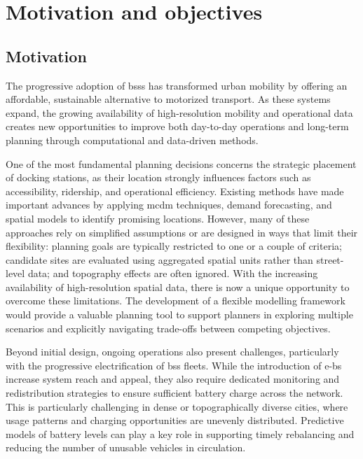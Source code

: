 \section{Motivation and objectives}
\label{sec:motivation_and_objectives}

\subsection{Motivation}

The progressive adoption of \acp{bss} has transformed urban mobility by offering an affordable, sustainable alternative to motorized transport. As these systems expand, the growing availability of high-resolution mobility and operational data creates new opportunities to improve both day-to-day operations and long-term planning through computational and data-driven methods.

One of the most fundamental planning decisions concerns the strategic placement of docking stations, as their location strongly influences factors such as accessibility, ridership, and operational efficiency. Existing methods have made important advances by applying \ac{mcdm} techniques, demand forecasting, and spatial models to identify promising locations. However, many of these approaches rely on simplified assumptions or are designed in ways that limit their flexibility: planning goals are typically restricted to one or a couple of criteria; candidate sites are evaluated using aggregated spatial units rather than street-level data; and topography effects are often ignored. With the increasing availability of high-resolution spatial data, there is now a unique opportunity to overcome these limitations. The development of a flexible modelling framework would provide a valuable planning tool to support planners in exploring multiple scenarios and explicitly navigating trade-offs between competing objectives.

Beyond initial design, ongoing operations also present challenges, particularly with the progressive electrification of \ac{bss} fleets. While the introduction of \acp{e-b} increase system reach and appeal, they also require dedicated monitoring and redistribution strategies to ensure sufficient battery charge across the network. This is particularly challenging in dense or topographically diverse cities, where usage patterns and charging opportunities are unevenly distributed. Predictive models of battery levels can play a key role in supporting timely rebalancing and reducing the number of unusable vehicles in circulation.

